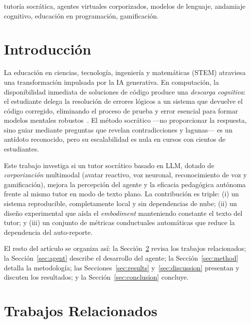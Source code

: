 \documentclass[conference]{IEEEtran}
\begin{document}
\begin{IEEEkeywords}
tutor\'ia socr\'atica, agentes virtuales corporizados, modelos de lenguaje, andamiaje
cognitivo, educaci\'on en programaci\'on, gamificaci\'on.
\end{IEEEkeywords}

\section{Introducci\'on}
La educaci\'on en ciencias, tecnolog\'ia, ingenier\'ia y matem\'aticas (STEM) atraviesa una
transformaci\'on impulsada por la IA generativa. En computaci\'on, la disponibilidad inmediata
de soluciones de c\'odigo produce una \emph{descarga cognitiva}: el estudiante delega la
resoluci\'on de errores l\'ogicos a un sistema que devuelve el c\'odigo corregido, eliminando el
proceso de prueba y error esencial para formar modelos mentales robustos~\cite{phung2023generative,raihan2025llms}.
El m\'etodo socr\'atico ---no proporcionar la respuesta, sino guiar mediante preguntas que
revelan contradicciones y lagunas--- es un ant\'idoto reconocido, pero su escalabilidad es nula
en cursos con cientos de estudiantes.

Este trabajo investiga si un tutor socr\'atico basado en LLM, dotado de \emph{corporizaci\'on}
multimodal (avatar reactivo, voz neuronal, reconocimiento de voz y gamificaci\'on), mejora la
percepci\'on del agente y la eficacia pedag\'ogica aut\'onoma frente al mismo tutor en modo de
texto plano. La contribuci\'on es triple: (i) un sistema reproducible, completamente local y
sin dependencias de nube; (ii) un dise\~no experimental que a\'isla el \emph{embodiment}
manteniendo constante el texto del tutor; y (iii) un conjunto de m\'etricas conductuales
autom\'aticas que reduce la dependencia del auto-reporte.

El resto del art\'iculo se organiza as\'i: la Secci\'on~\ref{sec:related} revisa los trabajos
relacionados; la Secci\'on~\ref{sec:agent} describe el desarrollo del agente; la
Secci\'on~\ref{sec:method} detalla la metodolog\'ia; las Secciones~\ref{sec:results}
y~\ref{sec:discussion} presentan y discuten los resultados; y la Secci\'on~\ref{sec:conclusion}
concluye.

\section{Trabajos Relacionados}
\label{sec:related}
\end{document}
